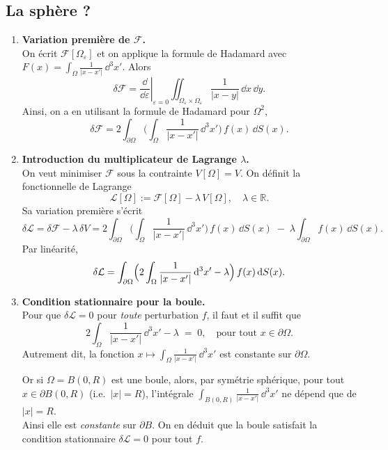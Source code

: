 \documentclass[a4paper,10pt]{report}
\newcommand{\RR}{\mathbb{R}}
\begin{document}
		\subsection{La sphère ?}
		\begin{enumerate}
			\item \textbf{Variation première de \(\mathcal{F}\).}\\
			On écrit 
			\(\displaystyle \mathcal{F}[\Omega_\varepsilon]\) 
			et on applique la formule de Hadamard avec 
			\(F(x) = \int_\Omega \frac{1}{\lvert x - x' \rvert}\,\dd^3x'\). 
			Alors
			\[
			\delta\mathcal{F} 
			= \left.\frac{\dd}{\dd\varepsilon}\right|_{\varepsilon=0} 
			\iint_{\Omega_\varepsilon \times \Omega_\varepsilon} \frac{1}{\lvert x - y \rvert}\,\dd x\,\dd y.
			\]
			Ainsi, on a en utilisant la formule de Hadamard pour $\Omega^2$,
			\[
			\delta\mathcal{F} 
			= 2 \int_{\partial \Omega} \biggl(\int_{\Omega} \frac{1}{\lvert x - x' \rvert}\,\dd^3x' \biggr)\,f(x)\,\dd S(x).
			\]
			\item \textbf{Introduction du multiplicateur de Lagrange \(\lambda\).}\\
			On veut minimiser \(\mathcal{F}\) sous la contrainte \(V[\Omega]=V\). 
			On définit la fonctionnelle de Lagrange
			\[
			\mathcal{L}[\Omega] 
			:= \mathcal{F}[\Omega] - \lambda\,V[\Omega],
			\quad \lambda \in \RR.
			\]
			Sa variation première s’écrit
			\[
			\delta\mathcal{L} 
			= \delta\mathcal{F} - \lambda\,\delta V 
			= 2 \int_{\partial \Omega} \biggl(\int_{\Omega} \frac{1}{\lvert x - x' \rvert}\,\dd^3x' \biggr)\,f(x)\,\dd S(x)
			\;-\; \lambda \int_{\partial \Omega} f(x)\,\dd S(x).
			\]
			Par linéarité,
			\[
			\delta\mathcal{L} 
			= \int_{\partial \Omega} \Bigl(2 \int_{\Omega} \frac{1}{\lvert x - x' \rvert}\,\dd^3x' - \lambda \Bigr)\,f(x)\,\dd S(x).
			\]
			
			\item \textbf{Condition stationnaire pour la boule.}\\
			Pour que \(\delta\mathcal{L} = 0\) pour \emph{toute} perturbation \(f\), il faut et il suffit que 
			\[
			2 \int_{\Omega} \frac{1}{\lvert x - x' \rvert}\,\dd^3x' - \lambda 
			\;=\; 0,
			\quad \text{pour tout } x \in \partial \Omega.
			\]
			Autrement dit, la fonction 
			\(\displaystyle x\mapsto \int_{\Omega} \frac{1}{\lvert x - x' \rvert}\,\dd^3x'\)
			est constante sur \(\partial \Omega\). 
			
			Or si \(\Omega = B(0,R)\) est une boule, alors, par symétrie sphérique, pour tout 
			\(x \in \partial B(0,R)\) (i.e.\ \(\lvert x \rvert = R\)), l’intégrale
			\(\displaystyle \int_{B(0,R)} \frac{1}{\lvert x - x' \rvert}\,\dd^3x'\) 
			ne dépend que de \(\lvert x \rvert = R\). \\ 
			Ainsi elle est \emph{constante} sur \(\partial B\). 
			On en déduit que la boule satisfait la condition stationnaire \(\delta\mathcal{L}=0\) pour tout \(f\).
			

\end{enumerate}
\end{document}
